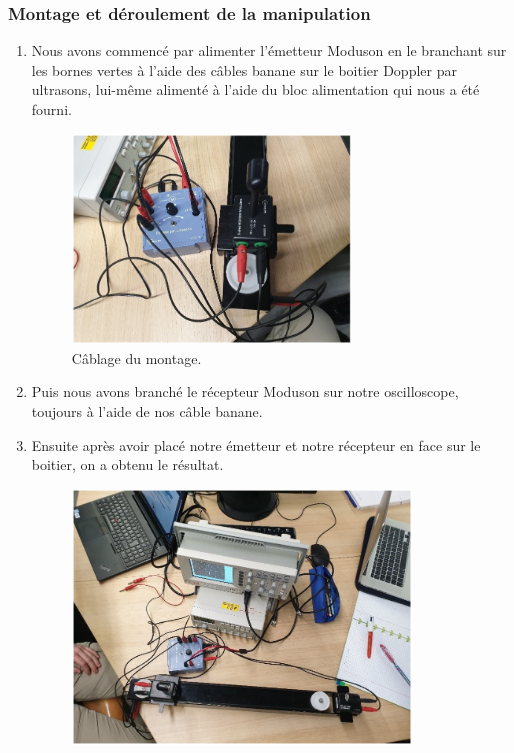 \documentclass[a4paper]{article}
\begin{document}
\subsubsection{Montage et déroulement de la manipulation}





\begin{enumerate}
  \item Nous avons commencé par alimenter l’émetteur Moduson en le branchant sur les bornes vertes à l’aide des câbles banane sur le boitier Doppler par ultrasons, lui-même alimenté à l’aide du bloc alimentation qui nous a été fourni.
  \begin{figure}[H]
    \centering
    \includegraphics[width=0.7\textwidth]{montage-complet1.PNG}
    \caption{Câblage du montage.}
    \label{fig:cablageDoppler}
  \end{figure}
  \item Puis nous avons branché le récepteur Moduson sur notre oscilloscope, toujours à l’aide de nos câble banane.
  \item Ensuite après avoir placé notre émetteur et notre récepteur en face sur le boitier, on a obtenu le résultat.
  \begin{figure}[H]
    \centering
    \includegraphics[width=0.85\textwidth]{montage-complet2.PNG}

\end{figure}
\end{enumerate}
\end{document}
